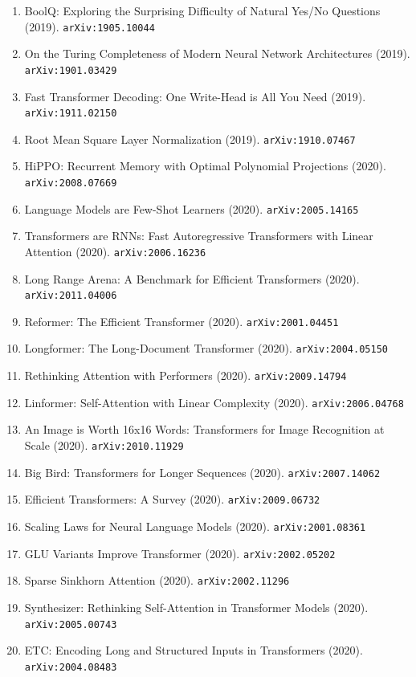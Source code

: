 \documentclass[11pt]{article}
\begin{document}
\begin{enumerate}
  Attention via the Lens of Kernel (2019). \texttt{arXiv:1908.11775}
  \item BoolQ: Exploring the Surprising Difficulty of Natural Yes/No Questions (2019). \texttt{arXiv:1905.10044}
  \item On the Turing Completeness of Modern Neural Network Architectures (2019). \texttt{arXiv:1901.03429}
  \item Fast Transformer Decoding: One Write-Head is All You Need (2019). \texttt{arXiv:1911.02150}
  \item Root Mean Square Layer Normalization (2019). \texttt{arXiv:1910.07467}
  \item HiPPO: Recurrent Memory with Optimal Polynomial Projections (2020). \texttt{arXiv:2008.07669}
  \item Language Models are Few-Shot Learners (2020). \texttt{arXiv:2005.14165}
  \item Transformers are RNNs: Fast Autoregressive Transformers with Linear
  Attention (2020). \texttt{arXiv:2006.16236}
  \item Long Range Arena: A Benchmark for Efficient Transformers (2020). \texttt{arXiv:2011.04006}
  \item Reformer: The Efficient Transformer (2020). \texttt{arXiv:2001.04451}
  \item Longformer: The Long-Document Transformer (2020). \texttt{arXiv:2004.05150}
  \item Rethinking Attention with Performers (2020). \texttt{arXiv:2009.14794}
  \item Linformer: Self-Attention with Linear Complexity (2020). \texttt{arXiv:2006.04768}
  \item An Image is Worth 16x16 Words: Transformers for Image Recognition at
  Scale (2020). \texttt{arXiv:2010.11929}
  \item Big Bird: Transformers for Longer Sequences (2020). \texttt{arXiv:2007.14062}
  \item Efficient Transformers: A Survey (2020). \texttt{arXiv:2009.06732}
  \item Scaling Laws for Neural Language Models (2020). \texttt{arXiv:2001.08361}
  \item GLU Variants Improve Transformer (2020). \texttt{arXiv:2002.05202}
  \item Sparse Sinkhorn Attention (2020). \texttt{arXiv:2002.11296}
  \item Synthesizer: Rethinking Self-Attention in Transformer Models (2020). \texttt{arXiv:2005.00743}
  \item ETC: Encoding Long and Structured Inputs in Transformers (2020). \texttt{arXiv:2004.08483}

\end{enumerate}
\end{document}
